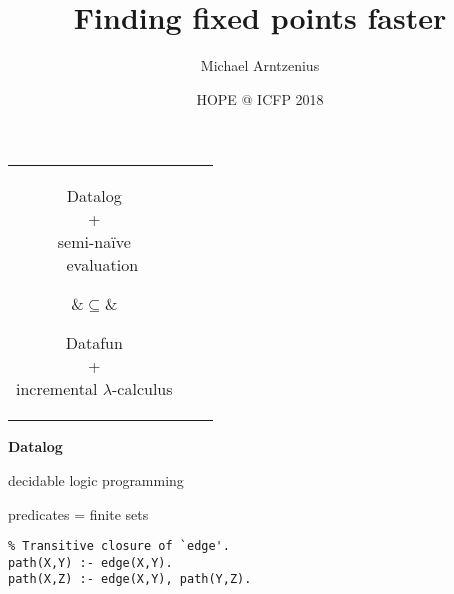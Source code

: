 \documentclass{beamer}
\title{Finding fixed points faster}
\author{Michael Arntzenius}
\institute{University of Birmingham}
\date{HOPE @ ICFP 2018}
\begin{document}
\maketitle

\begin{frame}
  \huge
  \begin{center}
    \begin{tabular}{ccc}
      \parbox{4cm}{
        \begin{center}
           Datalog\\ +\\
           semi-na\"ive\\\ \ evaluation
        \end{center}}
      &{\Huge $\subseteq$}&
      \parbox{4cm}{
        \begin{center}
           Datafun\\ +\\
           incremental $\lambda$-calculus
        \end{center}
      }
    \end{tabular}
  \end{center}
\end{frame}





\begin{frame}
  \Huge \centering \textbf{Datalog}\vspace{0.66cm}

  \huge decidable logic programming\vspace{0.66cm}

  predicates = finite sets
\end{frame}

\begin{frame}[fragile]
  \Large
  \begin{center}
\begin{verbatim}
% Transitive closure of `edge'.
path(X,Y) :- edge(X,Y).
path(X,Z) :- edge(X,Y), path(Y,Z).
\end{verbatim}
  \end{center}
\end{frame}
\end{document}
